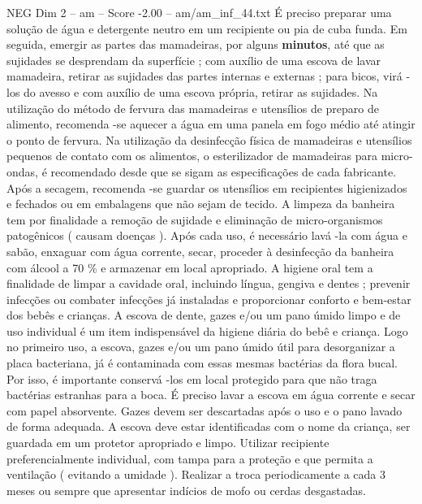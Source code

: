 \begin{textsample}{NEG Dim 2 – am – Score -2.00 – am/am\_inf\_44.txt}
É preciso preparar uma solução de água e detergente neutro em um recipiente ou pia de cuba funda.
Em seguida, emergir as partes das mamadeiras, por alguns \textbf{minutos}, até que as sujidades se desprendam da superfície ; com auxílio de uma escova de lavar mamadeira, retirar as sujidades das partes internas e externas ; para bicos, virá -los do avesso e com auxílio de uma escova própria, retirar as sujidades.
Na utilização do método de fervura das mamadeiras e utensílios de preparo de alimento, recomenda -se aquecer a água em uma panela em fogo médio até atingir o ponto de fervura.
Na utilização da desinfecção física de mamadeiras e utensílios pequenos de contato com os alimentos, o esterilizador de mamadeiras para micro-ondas, é recomendado desde que se sigam as especificações de cada fabricante.
Após a secagem, recomenda -se guardar os utensílios em recipientes higienizados e fechados ou em embalagens que não sejam de tecido.
A limpeza da banheira tem por finalidade a remoção de sujidade e eliminação de micro-organismos patogênicos ( causam doenças ).
Após cada uso, é necessário lavá -la com água e sabão, enxaguar com água corrente, secar, proceder à desinfecção da banheira com álcool a 70 \% e armazenar em local apropriado.
A higiene oral tem a finalidade de limpar a cavidade oral, incluindo língua, gengiva e dentes ; prevenir infecções ou combater infecções já instaladas e proporcionar conforto e bem-estar dos bebês e crianças.
A escova de dente, gazes e/ou um pano úmido limpo e de uso individual é um item indispensável da higiene diária do bebê e criança.
Logo no primeiro uso, a escova, gazes e/ou um pano úmido útil para desorganizar a placa bacteriana, já é contaminada com essas mesmas bactérias da flora bucal.
Por isso, é importante conservá -los em local protegido para que não traga bactérias estranhas para a boca.
É preciso lavar a escova em água corrente e secar com papel absorvente.
Gazes devem ser descartadas após o uso e o pano lavado de forma adequada.
A escova deve estar identificadas com o nome da criança, ser guardada em um protetor apropriado e limpo.
Utilizar recipiente preferencialmente individual, com tampa para a proteção e que permita a ventilação ( evitando a umidade ).
Realizar a troca periodicamente a cada 3 meses ou sempre que apresentar indícios de mofo ou cerdas desgastadas.

\end{textsample}
